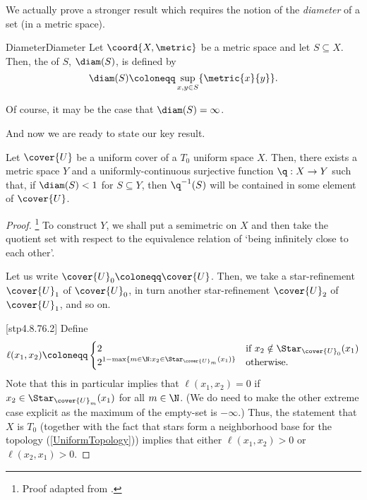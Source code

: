 We actually prove a stronger result which requires the notion of the \emph{diameter} of a set (in a metric space).
\begin{dfn}{Diameter}{Diameter}
Let $\coord{X,\metric}$ be a metric space and let $S\subseteq X$.  Then, the  of $S$, $\diam (S)$, is defined by
\begin{equation}
\diam (S)\coloneqq \sup _{x,y\in S}\{ \metric{x}{y}\} .
\end{equation}
\begin{rmk}
Of course, it may be the case that $\diam (S)=\infty$.
\end{rmk}
\end{dfn}
And now we are ready to state our key result.
\begin{thm}{}{}
Let $\cover{U}$ be a uniform cover of a $T_0$ uniform space $X$.  Then, there exists a metric space $Y$ and a uniformly-continuous surjective function $\q :X\rightarrow Y$ such that, if $\diam (S)<1$ for $S\subseteq Y$, then $\q ^{-1}(S)$ will be contained in some element of $\cover{U}$.
\begin{proof}\footnote{Proof adapted from \cite[pg.~8]{Isbell}.}
To construct $Y$, we shall put a semimetric on $X$ and then take the quotient set with respect to the equivalence relation of `being infinitely close to each other'.

\blankline
{}
Let us write $\cover{U}_0\coloneqq \cover{U}$.  Then, we take a star-refinement $\cover{U}_1$ of $\cover{U}_0$, in turn another star-refinement $\cover{U}_2$ of $\cover{U}_1$, and so on.

[stp4.8.76.2]
Define
{\scriptsize
\begin{equation}\label{eqn4.3.21}
\ell (x_1,x_2)\coloneqq \begin{cases}2 & \text{if }x_2\notin \Star _{\cover{U}_0}(x_1) \\ 2^{1-\max \{ m\in \N :x_2\in \Star _{\cover{U}_m}(x_1)\}} & \text{otherwise.}\end{cases}
\end{equation}
}
Note that this in particular implies that $\ell (x_1,x_2)=0$ if $x_2\in \Star _{\cover{U}_m}(x_1)$ for all $m\in \N$.  (We do need to make the other extreme case explicit as the maximum of the empty-set is $-\infty$.)  Thus, the statement that $X$ is $T_0$ (together with the fact that stars form a neighborhood base for the topology (\cref{UniformTopology})) implies that either $\ell (x_1,x_2)>0$ or $\ell (x_2,x_1)>0$.


\end{proof}
\end{thm}
